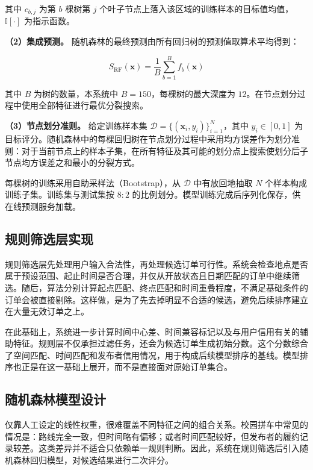 其中 $c_{b,j}$ 为第 $b$ 棵树第 $j$ 个叶子节点上落入该区域的训练样本的目标值均值，$\mathbb{I}[\cdot]$ 为指示函数。

\textbf{（2）集成预测。}
随机森林的最终预测由所有回归树的预测值取算术平均得到：

\begin{equation}
S_{\text{RF}}(\mathbf{x}) = \frac{1}{B} \sum_{b=1}^{B} f_b(\mathbf{x})
\label{eq:rf-pred}
\end{equation}

其中 $B$ 为树的数量，本系统中 $B = 150$，每棵树的最大深度为 $12$。在节点划分过程中使用全部特征进行最优分裂搜索。

\textbf{（3）节点划分准则。}
给定训练样本集 $\mathcal{D} = \{ (\mathbf{x}_i, y_i) \}_{i=1}^{N}$，其中 $y_i \in [0, 1]$ 为目标评分。随机森林中的每棵回归树在节点划分过程中采用均方误差作为划分准则：对于当前节点上的样本子集，在所有特征及其可能的划分点上搜索使划分后子节点均方误差之和最小的分裂方式。

每棵树的训练采用自助采样法（Bootstrap），从 $\mathcal{D}$ 中有放回地抽取 $N$ 个样本构成训练子集。训练集与测试集按 $8:2$ 的比例划分。模型训练完成后序列化保存，供在线预测服务加载。

\subsection{规则筛选层实现}

规则筛选层先处理用户输入合法性，再处理候选订单可行性。系统会检查地点是否属于预设范围、起止时间是否合理，并仅从开放状态且日期匹配的订单中继续筛选。随后，算法分别计算起点匹配、终点匹配和时间重叠程度，不满足基础条件的订单会被直接剔除。这样做，是为了先去掉明显不合适的候选，避免后续排序建立在大量无效订单之上。

在此基础上，系统进一步计算时间中心差、时间兼容标记以及与用户信用有关的辅助特征。规则层不仅承担过滤任务，还会为候选订单生成初始分数。这个分数综合了空间匹配、时间匹配和发布者信用情况，用于构成后续模型排序的基线。模型排序也正是在这一基础上展开，而不是直接面对原始订单集合。


\subsection{随机森林模型设计}

仅靠人工设定的线性权重，很难覆盖不同特征之间的组合关系。校园拼车中常见的情况是：路线完全一致，但时间略有偏移；或者时间匹配较好，但发布者的履约记录较差。这类差异并不适合只依赖单一规则判断。因此，系统在规则筛选后引入随机森林回归模型，对候选结果进行二次评分。

